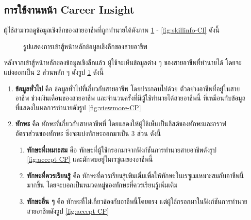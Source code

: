 \subsection{การใช้งานหน้า Career Insight}
ผู้ใช้สามารถดูข้อมูลเชิงลึกของสายอาชีพที่ถูกทำนายได้ดังภาพ \ref{fig:home-CI} - \ref{fig:skillinfo-CI} ดังนี้
\begin{figure}[H]\centering
    \caption{รูปแสดงการเข้าสู้หน้าหลักข้อมูลเชิงลึกของสายอาชีพ}\label{fig:home-CI}
\end{figure}
หลังจากเข้าสู้หน้าหลักของข้อมูลเชิงลึกแล้ว ผู้ใช้จะเห็นข้อมูลต่าง ๆ ของสายอาชีพที่ทำนายได้ โดยจะแบ่งออกเป็น 2 ส่วนหลัก ๆ ดังรูป \ref{fig:home-CI} ดังนี้ 
\begin{enumerate}
    \item \textbf{ข้อมูลทั่วไป} คือ ข้อมูลทั่วไปที่เกี่ยวกับสายอาชีพ โดยประกอบไปด้วย ตัวอย่างอาชีพที่อยู่ในสายอาชีพ ช่วงเงินเดือนของสายอาชีพ และจำนวนครั้งที่มีผู้ใช้ทำนายได้สายอาชีพนี้ ที่เหมือนกับข้อมูลที่แสดงในผลการทำนายดังรูป \ref{fig:viewmore-CP}
    \item \textbf{ทักษะ} คือ ทักษะที่เกี่ยวกับสายอาชีพที่ โดยแสดงให้ผู้ใช้เห็นเป็นลิสต์ของทักษะและกราฟอัตราส่วนของทักษะ ซึ่งจะแบ่งทักษะออกมาเป็น 3 ส่วน ดังนี้
    \begin{enumerate}
        \item \textbf{ทักษะที่เหมาะสม} คือ ทักษะที่ผู้ใช้กรอกมาจากฟังก์ชันการทำนายสายอาชีพดังรูป \ref{fig:accept-CP} และมักพบอยู่ในเรซูเมของอาชีพนี้
        \item \textbf{ทักษะที่ควรเรียนรู้} คือ ทักษะที่ควรเรียนรู้เพิมเติ่มเพื่อให้ทักษะในเรซูเมเหมาะสมกับอาชีพนี้มากขึ้น โดยจะบอกเป็นหมวดหมู่ของทักษะที่ควรเรียนรู้เพิ่มเติม
        \item \textbf{ทักษะอื่น ๆ} คือ ทักษะที่ไม่เกี่ยวข้องกับอาชีพนี้โดยตรง แต่ผู้ใช้กรอกมาในฟังก์ชันการทำนายสายอาชีพดังรูป \ref{fig:accept-CP}
    \end{enumerate}
\end{enumerate}
